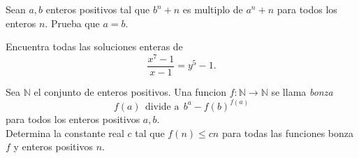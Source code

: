 \documentclass[11pt]{scrartcl}
\newcommand{\thmdifficulty}{0}
\newcommand{\problemdiff}[1]{\renewcommand{\thmdifficulty}{#1}}
\begin{document}
\problemdiff{7}
\begin{problem}
    Sean $a,b$ enteros positivos tal que $b^n +n$ es multiplo de $a^n+n$ para todos los enteros $n$. Prueba que $a=b$.
\end{problem}

\problemdiff{7}
\begin{problem}
    Encuentra todas las soluciones enteras de 
    \[\frac {x^{7} - 1}{x - 1} = y^{5} - 1.\]
\end{problem}

\problemdiff{7}
\begin{problem}
    Sea $\mathbb{N}$ el conjunto de enteros positivos. Una funcion $f\colon\mathbb{N}\to\mathbb{N}$ se llama \textit{bonza}
    \[
f(a)~~\text{divide a}~~b^a-f(b)^{f(a)}
\]
para todos los enteros positivos $a,b$. \\
Determina la constante real $c$ tal que $f(n) \leq cn $ para todas las funciones bonza $f$ y enteros positivos $n$.
\end{problem}
\end{document}
